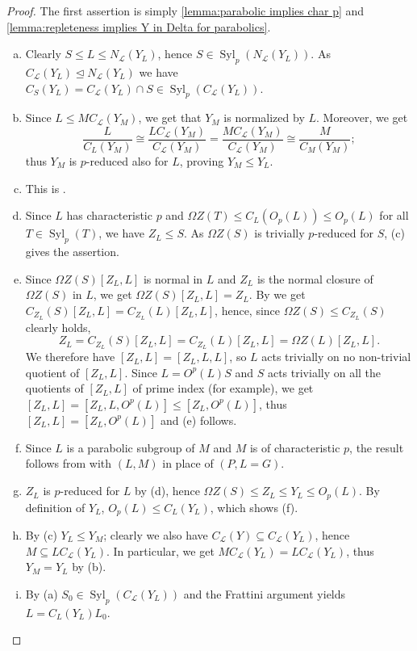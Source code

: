 \documentclass{amsart}
\numberwithin{equation}{section}
\theoremstyle{definition}
\theoremstyle{subresult}
\theoremstyle{caseresult}
\renewcommand{\L}{\mathcal{L}}
\newcommand{\Syl}{\operatorname{Syl}}
\newcommand{\norm}{\trianglelefteq}
\newcommand{\<}{\langle}
\renewcommand{\>}{\rangle}
\begin{document}
\begin{proof}
The first assertion is simply \ref{lemma:parabolic implies char p} and \ref{lemma:repleteness implies Y in Delta for parabolics}.
\begin{enumerate}[(a)]
\item Clearly $S \le L \le N_\L(Y_L)$, hence $S \in \Syl_p(N_\L(Y_L))$. As $C_\L(Y_L) \norm N_\L(Y_L)$ we have $C_S(Y_L) = C_\L(Y_L) \cap S \in \Syl_p(C_\L(Y_L))$.
\item Since $L \le MC_\L(Y_M)$, we get that $Y_M$ is normalized by $L$. Moreover, we get
\[
\frac{L}{C_L(Y_M)} \cong \frac{LC_\L(Y_M)}{C_\L(Y_M)} = \frac{MC_\L(Y_M)}{C_\L(Y_M)} \cong \frac{M}{C_M(Y_M)};
\]
thus $Y_M$ is $p$-reduced also for $L$, proving $Y_M \le Y_L$.
\item This is \cite[Lemma 2.2(b)]{MS:2009}.
\item Since $L$ has characteristic $p$ and $\Omega Z(T) \le C_L(O_p(L)) \le O_p(L)$ for all $T \in \Syl_p(T)$, we have $Z_L \le S$. As $\Omega Z(S)$ is trivially $p$-reduced for $S$, (c) gives the assertion.
\item Since $\Omega Z(S) [Z_L,L]$ is normal in $L$ and $Z_L$ is the normal closure of $\Omega Z(S)$ in $L$, we get $\Omega Z(S) [Z_L,L] = Z_L$. By \cite[Theorem C.17]{Meier-Stell-Stroth:2012} we get $C_{Z_L}(S)[Z_L,L] = C_{Z_L}(L)[Z_L,L]$, hence, since $\Omega Z(S) \le C_{Z_L}(S)$ clearly holds,
\[
Z_L = C_{Z_L}(S)[Z_L,L] = C_{Z_L}(L)[Z_L,L] = \Omega Z(L) [Z_L,L].
\]
We therefore have $[Z_L,L]=[Z_L,L,L]$, so $L$ acts trivially on no non-trivial quotient of $[Z_L,L]$. Since $L = O^p(L)S$ and $S$ acts trivially on all the quotients of $[Z_L,L]$ of prime index (for example), we get $[Z_L,L] = [Z_L,L,O^p(L)] \le [Z_L, O^p(L)]$, thus $[Z_L,L]=[Z_L,O^p(L)]$ and (e) follows.
\item Since $L$ is a parabolic subgroup of $M$ and $M$ is of characteristic $p$, the result follows from \cite[Lemma 2.2(c)]{MS:2009} with $(L,M)$ in place of $(P,L=G)$.
\item $Z_L$ is $p$-reduced for $L$ by (d), hence $\Omega Z(S) \le Z_L \le Y_L \le O_p(L)$. By definition of $Y_L$, $O_p(L) \le C_L(Y_L)$, which shows (f).
\item By (c) $Y_L \le Y_M$; clearly we also have $C_\L(Y) \subseteq C_\L(Y_L)$, hence $M \subseteq LC_\L(Y_L)$. In particular, we get $MC_\L(Y_L) = LC_\L(Y_L)$, thus $Y_M = Y_L$ by (b).
\item By (a) $S_0 \in \Syl_p(C_\L(Y_L))$ and the Frattini argument yields $L=C_L(Y_L) L_0$.\\

\end{enumerate}
\end{proof}
\end{document}
